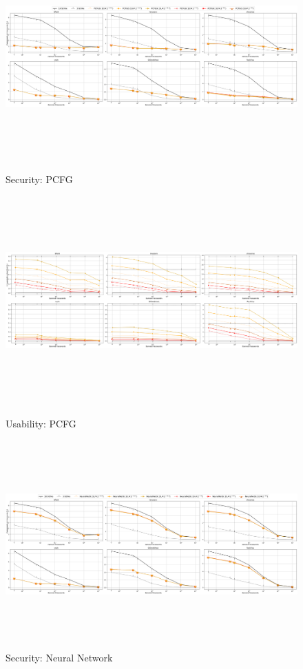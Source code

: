 \begin{figure}
	\includegraphics[width=\linewidth, height = 8cm]{Figures/Experiments/Attacker/SecurityPCFG}
\vspace{-0.2in}
	\caption[Security: PCFG Estimator]{Security: PCFG}
	\label{fig:securitypcfg}
	\includegraphics[width=\linewidth, height = 8cm]{Figures/Experiments/Utility/UsabilityPCFG}
	\vspace{-0.2in}
	\caption[Usability: PCFG Estimator]{Usability: PCFG}
	\label{fig:usabilitypcfg}
			\includegraphics[width=\linewidth, height = 8cm]{Figures/Experiments/Attacker/SecurityNeuralNet}
	\vspace{-0.2in}
	\caption[Security: Neural Network Estimator]{Security: Neural Network}
	\label{fig:securityneuralnet}
\end{figure}
